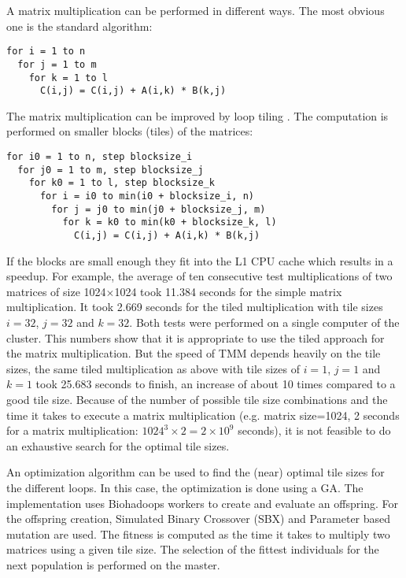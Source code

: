 A matrix multiplication can be performed in different ways. The most obvious one is the standard algorithm:
\begin{lstlisting}
for i = 1 to n
  for j = 1 to m
    for k = 1 to l
      C(i,j) = C(i,j) + A(i,k) * B(k,j)
\end{lstlisting}

The matrix multiplication can be improved by loop tiling \cite{wolfe1989more}. The computation is performed on smaller blocks (tiles) of the matrices:
\begin{lstlisting}
for i0 = 1 to n, step blocksize_i
  for j0 = 1 to m, step blocksize_j
    for k0 = 1 to l, step blocksize_k
      for i = i0 to min(i0 + blocksize_i, n)
        for j = j0 to min(j0 + blocksize_j, m)
          for k = k0 to min(k0 + blocksize_k, l)
            C(i,j) = C(i,j) + A(i,k) * B(k,j)
\end{lstlisting}

If the blocks are small enough they fit into the L1 CPU cache which results in a speedup. For example, the average of ten consecutive test multiplications of two matrices of size 1024$\times$1024 took 11.384 seconds for the simple matrix multiplication. It took 2.669 seconds for the tiled multiplication with tile sizes $i=32$, $j=32$ and $k=32$. Both tests were performed on a single computer of the cluster. This numbers show that it is appropriate to use the tiled approach for the matrix multiplication. But the speed of TMM depends heavily on the tile sizes, the same tiled multiplication as above with tile sizes of $i=1$, $j=1$ and $k=1$ took 25.683 seconds to finish, an increase of about 10 times compared to a good tile size. Because of the number of possible tile size combinations and the time it takes to execute a matrix multiplication (e.g. matrix size=1024, 2 seconds for a matrix multiplication: $1024^3 \times 2 = 2\times{10^9} $ seconds), it is not feasible to do an exhaustive search for the optimal tile sizes.

An optimization algorithm can be used to find the (near) optimal tile sizes for the different loops. In this case, the optimization is done using a GA. The implementation uses Biohadoops workers to create and evaluate an offspring. For the offspring creation, Simulated Binary Crossover (SBX) and Parameter based mutation are used. The fitness is computed as the time it takes to multiply two matrices using a given tile size. The selection of the fittest individuals for the next population is performed on the master.


